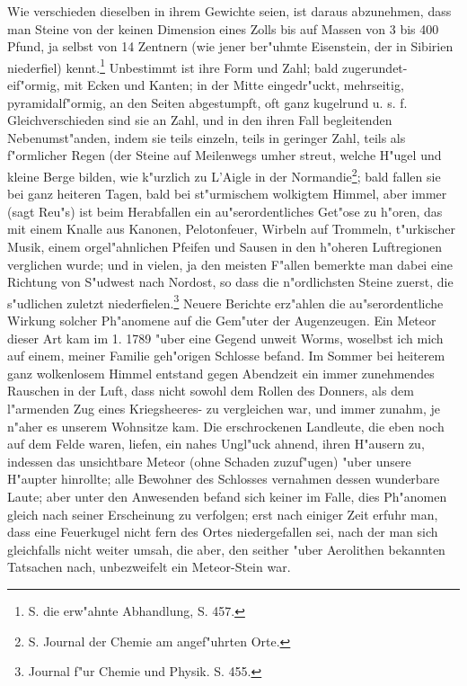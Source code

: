 \documentclass[a4paper, 11pt, oneside, polutonikogreek, german]{article}
\begin{document}
Wie verschieden dieselben in ihrem Gewichte seien, ist daraus abzunehmen, dass man Steine von der keinen Dimension eines Zolls bis auf Massen von 3 bis 400 Pfund, ja selbst von 14 Zentnern (wie jener ber"uhmte Eisenstein, der in Sibirien niederfiel) kennt.\footnote{S. die erw"ahnte Abhandlung, S. 457.} Unbestimmt ist ihre Form und Zahl; bald zugerundet-eif"ormig, mit Ecken und Kanten; in der Mitte eingedr"uckt, mehrseitig, pyramidalf"ormig, an den Seiten abgestumpft, oft ganz kugelrund u. s. f. Gleichverschieden sind sie an Zahl, und in den ihren Fall begleitenden Nebenumst"anden, indem sie teils einzeln, teils in geringer Zahl, teils als f"ormlicher Regen (der Steine auf Meilenwegs umher streut, welche H"ugel und kleine Berge bilden, wie k"urzlich zu L’Aigle in der Normandie\footnote{S. Journal der Chemie am angef"uhrten Orte.}; bald fallen sie bei ganz heiteren Tagen, bald bei st"urmischem wolkigtem Himmel, aber immer (sagt Reu"s) ist beim Herabfallen ein au"serordentliches Get"ose zu h"oren, das mit einem Knalle aus Kanonen, Pelotonfeuer, Wirbeln auf Trommeln, t"urkischer Musik, einem orgel"ahnlichen Pfeifen und Sausen in den h"oheren Luftregionen verglichen wurde; und in vielen, ja den meisten F"allen bemerkte man dabei eine Richtung von S"udwest nach Nordost, so dass die n"ordlichsten Steine zuerst, die s"udlichen zuletzt niederfielen.\footnote{Journal f"ur Chemie und Physik. S. 455.} Neuere Berichte erz"ahlen die au"serordentliche Wirkung solcher Ph"anomene auf die Gem"uter der Augenzeugen. Ein Meteor dieser Art kam im 1. 1789 "uber eine Gegend unweit Worms, woselbst ich mich auf einem, meiner Familie geh"origen Schlosse befand. Im Sommer bei heiterem ganz wolkenlosem Himmel entstand gegen Abendzeit ein immer zunehmendes Rauschen in der Luft, dass nicht sowohl dem Rollen des Donners, als dem l"armenden Zug eines Kriegsheeres- zu vergleichen war, und immer zunahm, je n"aher es unserem Wohnsitze kam. Die erschrockenen Landleute, die eben noch auf dem Felde waren, liefen, ein nahes Ungl"uck ahnend, ihren H"ausern zu, indessen das unsichtbare Meteor (ohne Schaden zuzuf"ugen) "uber unsere H"aupter hinrollte; alle Bewohner des Schlosses vernahmen dessen wunderbare Laute; aber unter den Anwesenden befand sich keiner im Falle, dies Ph"anomen gleich nach seiner Erscheinung zu verfolgen; erst nach einiger Zeit erfuhr man, dass eine Feuerkugel nicht fern des Ortes niedergefallen sei, nach der man sich gleichfalls nicht weiter umsah, die aber, den seither "uber Aerolithen bekannten Tatsachen nach, unbezweifelt ein Meteor-Stein war.
\end{document}
